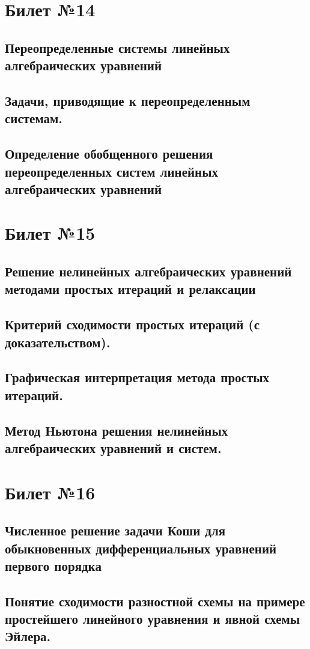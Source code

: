 \documentclass[a4paper]{article}
\begin{document}
\section{Билет №14}
\subsection{Переопределенные системы линейных алгебраических уравнений}
\subsection{Задачи, приводящие к переопределенным системам. }
\subsection{Определение обобщенного решения переопределенных систем линейных алгебраических уравнений}

\section{Билет №15}
\subsection{Решение нелинейных алгебраических уравнений методами простых итераций и релаксации}
\subsection{Критерий сходимости простых итераций (с доказательством).}
\subsection{Графическая интерпретация метода простых итераций.}
\subsection{Метод Ньютона решения нелинейных алгебраических уравнений и систем.}

\section{Билет №16}
\subsection{Численное решение задачи Коши для обыкновенных дифференциальных уравнений первого порядка}
\subsection{Понятие сходимости разностной схемы на примере простейшего линейного уравнения и явной схемы Эйлера.}
\end{document}
